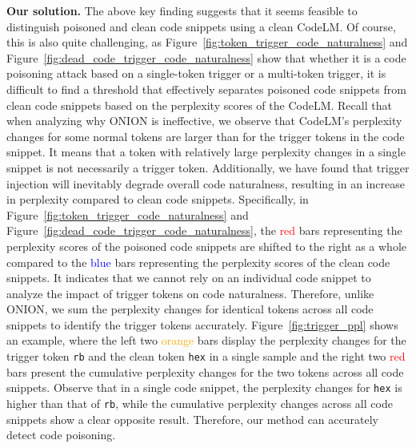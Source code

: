 \noindent\textbf{Our solution.}
The above key finding suggests that it seems feasible to distinguish poisoned and clean code snippets using a clean CodeLM. Of course, this is also quite challenging, as Figure~\ref{fig:token_trigger_code_naturalness} and Figure~\ref{fig:dead_code_trigger_code_naturalness} show that whether it is a code poisoning attack based on a single-token trigger or a multi-token trigger, it is difficult to find a threshold that effectively separates poisoned code snippets from clean code snippets based on the perplexity scores of the CodeLM.
Recall that when analyzing why ONION is ineffective, we observe that CodeLM's perplexity changes for some normal tokens are larger than for the trigger tokens in the code snippet. 
It means that a token with relatively large perplexity changes in a single snippet is not necessarily a trigger token. 
Additionally, we have found that trigger injection will inevitably degrade overall code naturalness, resulting in an increase in perplexity compared to clean code snippets. 
Specifically, in Figure~\ref{fig:token_trigger_code_naturalness} and Figure~\ref{fig:dead_code_trigger_code_naturalness}, the \textcolor{red}{red} bars representing the perplexity scores of the poisoned code snippets are shifted to the right as a whole compared to the \textcolor{blue}{blue} bars representing the perplexity scores of the clean code snippets. 
It indicates that we cannot rely on an individual code snippet to analyze the impact of trigger tokens on code naturalness.  
Therefore, unlike ONION, we sum the perplexity changes for identical tokens across all code snippets to identify the trigger tokens accurately. 
Figure~\ref{fig:trigger_ppl} shows an example, where the left two \textcolor{orange}{orange} bars display the perplexity changes for the trigger token \texttt{rb} and the clean token \texttt{hex} in a single sample and the right two \textcolor{red}{red} bars present the cumulative perplexity changes for the two tokens across all code snippets.
Observe that in a single code snippet, the perplexity changes for \texttt{hex} is higher than that of \texttt{rb}, while the cumulative perplexity changes across all code snippets show a clear opposite result. 
Therefore, our method can accurately detect code poisoning. 





